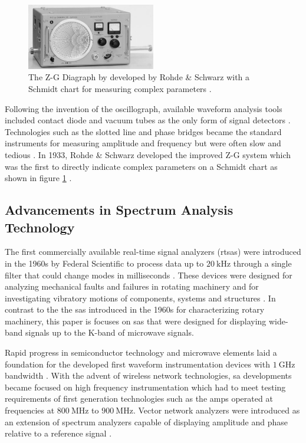 \documentclass[class=report,11pt,crop=false]{standalone}
\begin{document}
\begin{figure}
	\centering
	\includegraphics[width=0.50\textwidth]{Figures/Literature_Review/zg-diagraph}
	\caption{The Z-G Diagraph by developed by Rohde \& Schwarz with a Schmidt chart for measuring complex parameters \cite{rytting2008arftg}.}
	\label{fig:zg-diagraph}
\end{figure}

Following the invention of the oscillograph, available waveform analysis tools included contact diode and vacuum tubes as the only form of signal detectors \cite{vollinger2023}. Technologies such as the slotted line and phase bridges became the standard instruments for measuring amplitude and frequency but were often slow and tedious \cite{rytting2008arftg}. In 1933, Rohde \& Schwarz developed the improved Z-G system which was the first to directly indicate complex parameters on a Schmidt chart as shown in figure \ref{fig:zg-diagraph} \cite{rytting2008arftg}.  

\subsection{Advancements in Spectrum Analysis Technology}
 
The first commercially available real-time signal analyzers (\acrshort{rtsa}s) were introduced in the 1960s by Federal Scientific to process data up to $\SI{20}{\kilo\hertz}$ through a single filter that could change modes in milliseconds \cite{deery2007}. These devices were designed for analyzing mechanical faults and failures in rotating machinery and for investigating vibratory motions of components, systems and structures \cite{deery2007}. In contrast to the the \acrshort{sa}s introduced in the 1960s for characterizing rotary machinery, this paper is focuses on \acrshort{sa}s that were designed for displaying wide-band signals up to the K-band of microwave signals. 

Rapid progress in semiconductor technology and microwave elements laid a foundation for the developed first waveform instrumentation devices with $\SI{1}{\giga\hertz}$ bandwidth \cite{vollinger2023}. With the advent of wireless network technologies, \acrshort{sa} developments became focused on high frequency instrumentation which had to meet testing requirements of first generation technologies such as the \acrfull{amps} operated at frequencies at $\SI{800}{\mega\hertz}$ to $\SI{900}{\mega\hertz}$. Vector network analyzers were introduced as an extension of spectrum analyzers capable of displaying amplitude and phase relative to a reference signal \cite{helfrick2012}. 
\end{document}
